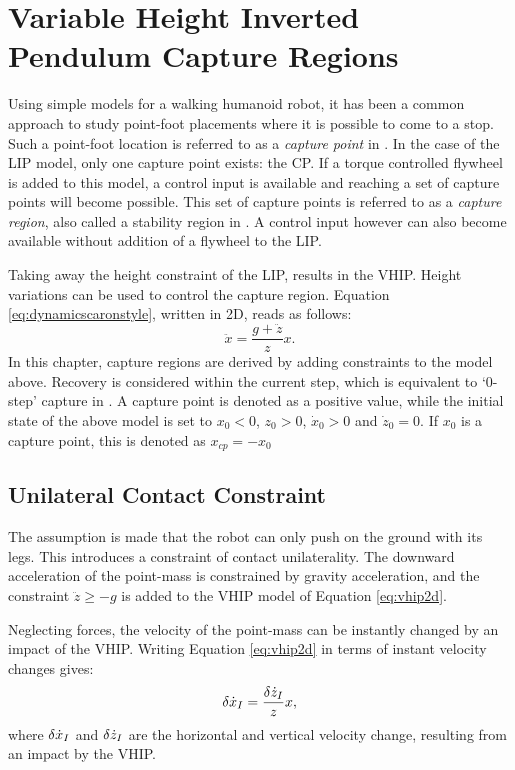 %
\chapter{Variable Height Inverted Pendulum Capture Regions}\label{chap:regions}
Using simple models for a walking humanoid robot, it has been a common approach to study point-foot placements where it is possible to come to a stop. Such a point-foot location is referred to as a \textit{capture point} in \cite{pratt2006capture}. In the case of the \ac{LIP} model, only one capture point exists: the \ac{CP}. If a torque controlled flywheel is added to this model, a control input is available and reaching a set of capture points will become possible. This set of capture points is referred to as a \textit{capture region}, also called a stability region in \cite{stephens2007humanoid}. A control input however can also become available without addition of a flywheel to the \ac{LIP}.


Taking away the height constraint of the \ac{LIP}, results in the \ac{VHIP}. Height variations can be used to control the capture region. Equation \ref{eq:dynamicscaronstyle}, written in \ac{2D}, reads as follows:
\begin{equation}
	\label{eq:vhip2d}
	\ddot{x}=\frac{g+\ddot{z}}{z}x.
\end{equation}	
In this chapter, capture regions are derived by adding constraints to the model above. Recovery is considered within the current step, which is equivalent to `0-step' capture in \cite{koolen2012capturability}. A capture point is denoted as a positive value, while the initial state of the above model is set to $x_0<0$, $z_0>0$, $\dot{x}_0>0$ and $\dot{z}_0=0$. If $x_0$ is a capture point, this is denoted as $x_{cp}=-x_0$



\section{Unilateral Contact Constraint}
The assumption is made that the robot can only push on the ground with its legs. This introduces a constraint of contact unilaterality. The downward acceleration of the point-mass is constrained by gravity acceleration, and the constraint $\ddot{z} \geq -g$ is added to the \ac{VHIP} model of Equation \ref{eq:vhip2d}.

Neglecting forces, the velocity of the point-mass can be instantly changed by an impact of the \ac{VHIP}. Writing Equation \ref{eq:vhip2d} in terms of instant velocity changes gives:
\begin{equation}
	\label{eq:vhipi}
	\delta \dot{x}_I=\frac{\delta \dot{z}_I}{z}x,
\end{equation}	
where $\delta \dot{x}_I$ and $\delta \dot{z}_I$ are the horizontal and vertical velocity change, resulting from an impact by the \ac{VHIP}.

